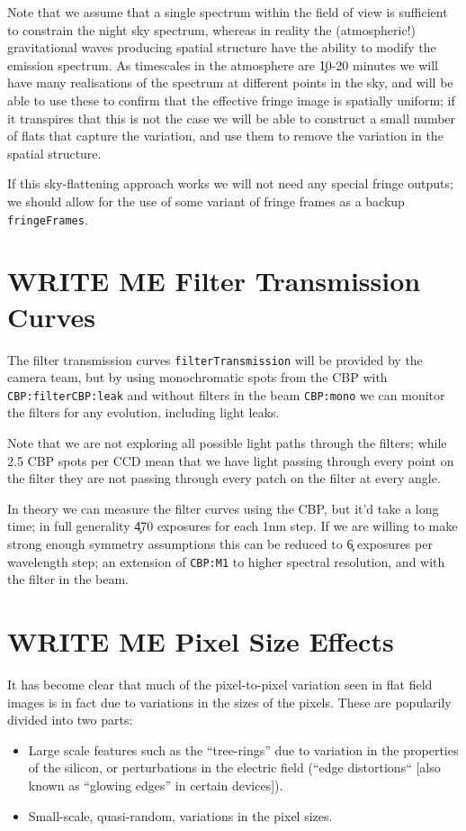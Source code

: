 \documentclass[DM,authoryear,toc,lsstdraft]{lsstdoc}
\newcommand{\inputData}[1]{\texttt{#1}}
\newcommand{\inputDataII}[2]{\texttt{#1}\texttt{#2}}
\newcommand{\outputData}[1]{\texttt{#1}}
\begin{document}
Note that we assume that a single spectrum within the field of view is sufficient to constrain the
night sky spectrum, whereas in reality the (atmospheric!) gravitational waves producing spatial structure
have the ability to modify the emission spectrum.   As timescales in the atmosphere are \c 10-20 minutes
we will have many realisations of the spectrum at different points in the sky, and will be able to use
these to confirm that the effective fringe image is spatially uniform;  if it transpires that this is
not the case we will be able to construct a small number of flats that capture the variation, and
use them to remove the variation in the spatial structure.

If this sky-flattening approach works we will not need any special fringe outputs;  we should
allow for the use of some variant of fringe frames as a backup \outputData{fringeFrames}.

\section{WRITE ME Filter Transmission Curves}

The filter transmission curves \inputData{filterTransmission} will be provided by the camera team, but by
using monochromatic spots from the CBP with \inputDataII{CBP:filter}{CBP:leak} and without filters in the beam
\inputData{CBP:mono} we can monitor the filters for any evolution, including light leaks.

Note that we are not exploring all possible light paths through the filters; while 2.5 CBP spots per CCD
mean that we have light passing through every point on the filter they are not passing through every
patch on the filter at every angle.

In theory we can measure the filter curves using the CBP, but it'd take a long time; in full generality \c 470
exposures for each 1nm step.  If we are willing to make strong enough symmetry assumptions this can be reduced
to \c 6 exposures per wavelength step; an extension of \inputData{CBP:M1} to higher spectral resolution, and
with the filter in the beam.

\section{WRITE ME Pixel Size Effects}
\label{correctingPixelSizes}

It has become clear that much of the pixel-to-pixel variation seen in flat field images is
in fact due to variations in the sizes of the pixels.  These are popularily divided into two
parts:
\begin{itemize}
\item Large scale features such as the ``tree-rings'' due to variation in the properties of the
	silicon, or perturbations in the electric field (\eg ``edge distortions`` [also known as ``glowing edges'' in certain devices]).
\item Small-scale, quasi-random, variations in the pixel sizes.
\end{itemize}
\end{document}
